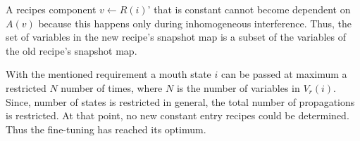 \documentclass[12pt,a4paper]{scrartcl}
\theoremstyle{break}
\begin{document}
A recipes component $v \leftarrow R(i)$' that is constant cannot become dependent on
$A(v)$ because this happens only during inhomogeneous interference. Thus, the
set of variables in the new recipe's snapshot map is a subset of the variables
of the old recipe's snapshot map.

With the mentioned requirement a mouth state $i$ can be passed at maximum a
restricted $N$ number of times, where $N$ is the number of variables in
$V_r(i)$. Since, number of states is restricted in general, the total number of
propagations is restricted. At that point, no new constant entry recipes could
be determined. Thus the fine-tuning has reached its optimum.
\end{document}

